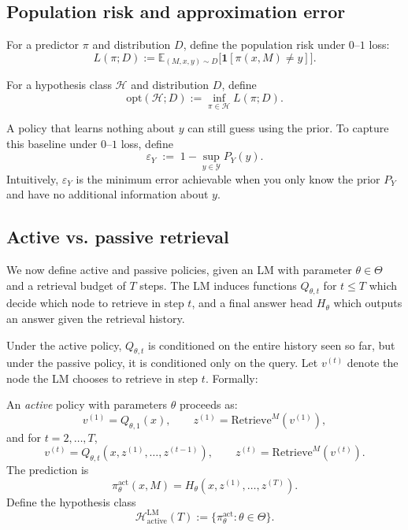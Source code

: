 \subsection{Population risk and approximation error}

\begin{definition}
For a predictor \(\pi\) and distribution \(D\), define the population risk under \(0\)--\(1\) loss:
\[
  L(\pi; D) := \mathbb{E}_{(M,x,y)\sim D}\bigl[\mathbf{1}[\pi(x,M)\neq y]\bigr].
\]
\end{definition}

\begin{definition}
For a hypothesis class \(\mathcal{H}\) and distribution \(D\), define
\[
  \mathrm{opt}(\mathcal{H}; D) := \inf_{\pi\in\mathcal{H}} L(\pi; D).
\]
\end{definition}

A policy that learns nothing about \(y\) can still guess using the prior.
To capture this baseline under \(0\)--\(1\) loss, define 
\[
  \varepsilon_Y \;:=\; 1 - \sup_{y \in \mathcal{Y}} P_Y(y).
\]
Intuitively, \(\varepsilon_Y\) is the minimum error achievable when you only know the
prior \(P_Y\) and have no additional information about \(y\).

\subsection{Active vs. passive retrieval}

We now define active and passive policies, given an LM with parameter $\theta \in \Theta$ and a retrieval budget of \(T\) steps. The LM induces functions $Q_{\theta,t}$ for $t \le T$ which decide which node to retrieve in step $t$, and a final answer head $H_\theta$ which outputs an answer given the retrieval history. 

Under the active policy, $Q_{\theta,t}$ is conditioned on the entire history seen so far, but under the passive policy, it is conditioned only on the query. Let $v^{(t)}$ denote the node the LM chooses to retrieve in step $t$. Formally:

\begin{definition}
An \emph{active} policy with parameters \(\theta\) proceeds as:
\[
  v^{(1)} = Q_{\theta,1}(x), \qquad z^{(1)} = \mathrm{Retrieve}^M(v^{(1)}),
\]
and for \(t=2,\dots,T\),
\[
  v^{(t)} = Q_{\theta,t}(x, z^{(1)},\dots,z^{(t-1)}), \qquad z^{(t)} = \mathrm{Retrieve}^M(v^{(t)}).
\]
The prediction is
\[
  \pi^{\mathrm{act}}_\theta(x,M) = H_\theta(x, z^{(1)},\dots,z^{(T)}).
\]
Define the hypothesis class
\[
  \mathcal{H}^{\mathrm{LM}}_{\mathrm{active}}(T) := \{\pi^{\mathrm{act}}_\theta : \theta\in\Theta\}.
\]
\end{definition}

